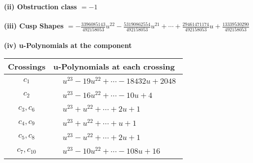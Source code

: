 \documentclass[1p]{elsarticle_modified}
\theoremstyle{definition}
\begin{document}
\flushleft \textbf{(ii) Obstruction class $= -1$}\\~\\
\flushleft \textbf{(iii) Cusp Shapes $= -\frac{3396085143}{492158053} u^{22}-\frac{53190862554}{492158053} u^{21}+\cdots+\frac{29461471174}{492158053} u+\frac{13339530290}{492158053}$}\\~\\
\newpage\renewcommand{\arraystretch}{1}
\flushleft \textbf{(iv) u-Polynomials at the component}\newline \\
\begin{tabular}{m{50pt}|m{274pt}}
Crossings & \hspace{64pt}u-Polynomials at each crossing \\
\hline $$\begin{aligned}c_{1}\end{aligned}$$&$\begin{aligned}
&u^{23}-19 u^{22}+\cdots-18432 u+2048
\end{aligned}$\\
\hline $$\begin{aligned}c_{2}\end{aligned}$$&$\begin{aligned}
&u^{23}-16 u^{22}+\cdots-10 u+4
\end{aligned}$\\
\hline $$\begin{aligned}c_{3},c_{6}\end{aligned}$$&$\begin{aligned}
&u^{23}+u^{22}+\cdots+2 u+1
\end{aligned}$\\
\hline $$\begin{aligned}c_{4},c_{9}\end{aligned}$$&$\begin{aligned}
&u^{23}+u^{22}+\cdots+u+1
\end{aligned}$\\
\hline $$\begin{aligned}c_{5},c_{8}\end{aligned}$$&$\begin{aligned}
&u^{23}- u^{22}+\cdots+2 u+1
\end{aligned}$\\
\hline $$\begin{aligned}c_{7},c_{10}\end{aligned}$$&$\begin{aligned}
&u^{23}-10 u^{22}+\cdots-108 u+16
\end{aligned}$\\
\hline
\end{tabular}\\~\\
\end{document}
